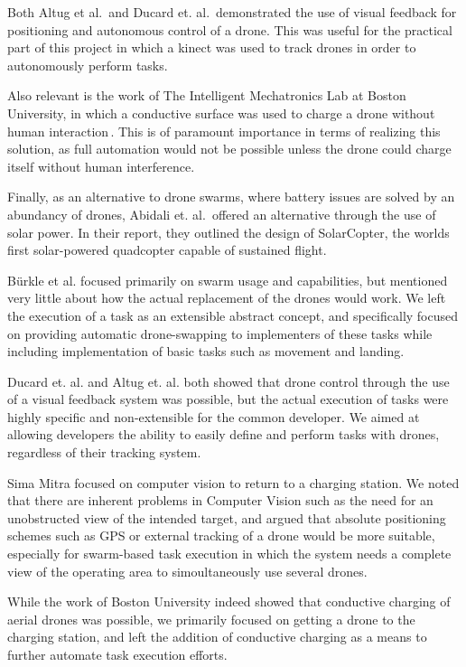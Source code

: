 Both Altug et al.\,\cite{altugetal} and Ducard et. al.\,\cite{ducardetal} demonstrated the use of visual feedback for positioning and autonomous control of a drone. This was useful for the practical part of this project in which a kinect was used to track drones in order to autonomously perform tasks.

Also relevant is the work of The Intelligent Mechatronics Lab at Boston University, in which a conductive surface was used to charge a drone without human interaction\,\cite{bostonuni}. This is of paramount importance in terms of realizing this solution, as full automation would not be possible unless the drone could charge itself without human interference.

Finally, as an alternative to drone swarms, where battery issues are solved by an abundancy of drones, Abidali et. al.\,\cite{solarcopter} offered an alternative through the use of solar power. In their report, they outlined the design of SolarCopter, the worlds first solar-powered quadcopter capable of sustained flight.

B\"urkle et al. focused primarily on swarm usage and capabilities, but mentioned very little about how the actual replacement of the drones would work. We left the execution of a task as an extensible abstract concept, and specifically focused on providing automatic drone-swapping to implementers of these tasks while including implementation of basic tasks such as movement and landing.

Ducard et. al. and Altug et. al. both showed that drone control through the use of a visual feedback system was possible, but the actual execution of tasks were highly specific and non-extensible for the common developer. We aimed at allowing developers the ability to easily define and perform tasks with drones, regardless of their tracking system.

Sima Mitra focused on computer vision to return to a charging station. We noted that there are inherent problems in Computer Vision such as the need for an unobstructed view of the intended target, and argued that absolute positioning schemes such as GPS or external tracking of a drone would be more suitable, especially for swarm-based task execution in which the system needs a complete view of the operating area to simoultaneously use several drones.

While the work of Boston University indeed showed that conductive charging of aerial drones was possible, we primarily focused on getting a drone to the charging station, and left the addition of conductive charging as a means to further automate task execution efforts.

